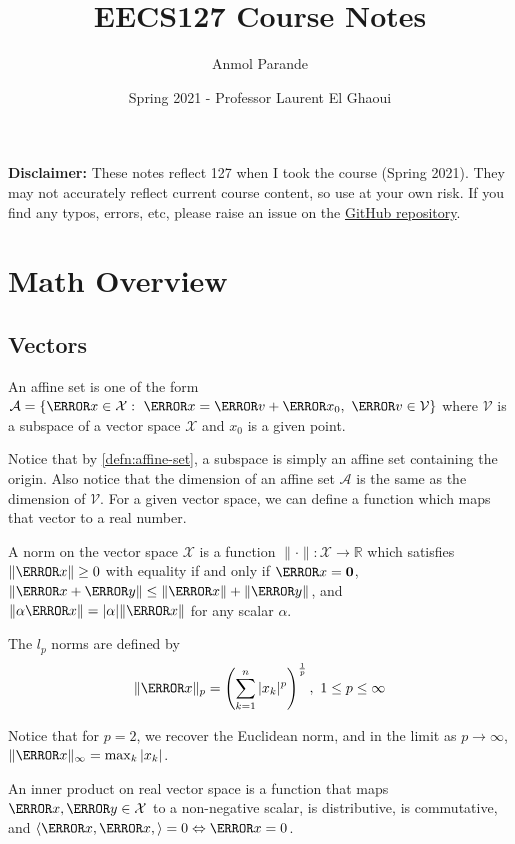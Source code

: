 

\title{EECS127 Course Notes}
\author{Anmol Parande}
\date{Spring 2021 - Professor Laurent El Ghaoui}
\maketitle
\textbf{Disclaimer: }These notes reflect 127 when I took the course (Spring 2021). They may not accurately reflect current course content, so use at your own risk.
If you find any typos, errors, etc, please raise an issue on the \href{https://github.com/parandea17/BerkeleyNotes}{GitHub repository}.
\tableofcontents
\newpage
\section{Math Overview}
\subsection{Vectors}
\begin{definition}
  An affine set is one of the form $\mathcal{A}=\{ \V{x}\in\mathcal{X}:\ \V{x}=\V{v}+\V{x_0},\ \V{v}\in\mathcal{V}\}$ where $\mathcal{V}$ is a subspace of a vector space $\mathcal{X}$ and $x_0$ is a given point.
  \label{defn:affine-set}
\end{definition}
Notice that by \cref{defn:affine-set}, a subspace is simply an affine set containing the origin. Also notice that the dimension of an affine set $\mathcal{A}$ is the same as the dimension of $\mathcal{V}$.
For a given vector space, we can define a function which maps that vector to a real number.
\begin{definition}
  A norm on the vector space $\mathcal{X}$ is a function $\|\cdot\|:\mathcal{X}\rightarrow\mathbb{R}$ which satisfies $\|\V{x}\|\geq 0$ with equality if and only if $\V{x}=\bs{0}$, $\|\V{x}+\V{y}\|\leq\|\V{x}\|+\|\V{y}\|$, and $\|\alpha \V{x}\| = |\alpha|\|\V{x}\|$ for any scalar $\alpha$.
  \label{defn:norm}
\end{definition}
\begin{definition}
  The $l_p$ norms are defined by
  \[
	\|\V{x}\|_p=\left( \sum_{k=1}^n|x_k|^p \right)^{\frac{1}{p}},\ 1\leq p\leq \infty
  \]
  \label{defn:lp-norm}
\end{definition}
Notice that for $p=2$, we recover the Euclidean norm, and in the limit as $p\to\infty$, $\norm{\V{x}}_{\infty} = \max_k|x_k|$.
\begin{definition}
  An inner product on real vector space is a function that maps $\V{x},\V{y} \in \mathcal{X}$ to a non-negative scalar, is distributive, is commutative, and $\langle \V{x}, \V{x}, \rangle = 0 \Leftrightarrow \V{x}=0$.
  \label{defn:inner-product}
\end{definition}
